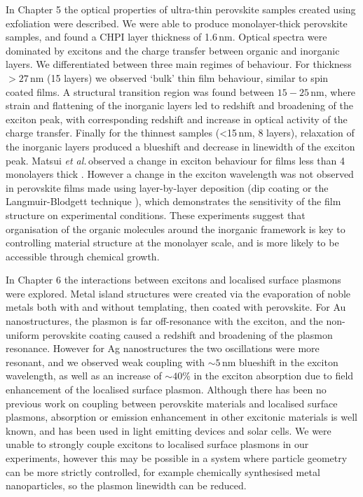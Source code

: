 In Chapter 5 the optical properties of ultra-thin perovskite samples created using exfoliation were described. We were able to produce monolayer-thick perovskite samples, and found a CHPI layer thickness of 1.6\,nm. Optical spectra were dominated by excitons and the charge transfer between organic and inorganic layers. We differentiated between three main regimes of behaviour. For thickness $>27$\,nm (15 layers) we observed `bulk' thin film behaviour, similar to spin coated films. A structural transition region was found between $15-25$\,nm, where strain and flattening of the inorganic layers led to redshift and broadening of the exciton peak, with corresponding redshift and increase in optical activity of the charge transfer. Finally for the thinnest samples (<15\,nm, 8 layers), relaxation of the inorganic layers produced a blueshift and decrease in linewidth of the exciton peak. %
Matsui \textit{et al.}\,observed a change in exciton behaviour for films less than 4 monolayers thick \cite{Matsui2002}. However a change in the exciton wavelength was not observed in perovskite films made using layer-by-layer deposition (dip coating \cite{Matsui2002} or the Langmuir-Blodgett technique \cite{Era2000}), which demonstrates the sensitivity of the film structure on experimental conditions. These experiments suggest that organisation of the organic molecules around the inorganic framework is key to controlling material structure at the monolayer scale, and is more likely to be accessible through chemical growth. %

In Chapter 6 the interactions between excitons and localised surface plasmons were explored. Metal island structures were created via the evaporation of noble metals both with and without templating, then coated with perovskite. For Au nanostructures, the plasmon is far off-resonance with the exciton, and the non-uniform perovskite coating caused a redshift and broadening of the plasmon resonance. However for Ag nanostructures the two oscillations were more resonant, and we observed weak coupling with $\sim 5$\,nm blueshift in the exciton wavelength, as well as an increase of $\sim 40$\% in the exciton absorption due to field enhancement of the localised surface plasmon. %
Although there has been no previous work on coupling between perovskite materials and localised surface plasmons, absorption or emission enhancement in other excitonic materials is well known, and has been used in light emitting devices and solar cells. We were unable to strongly couple excitons to localised surface plasmons in our experiments, however this may be possible in a system where particle geometry can be more strictly controlled, for example chemically synthesised metal nanoparticles, so the plasmon linewidth can be reduced. %

